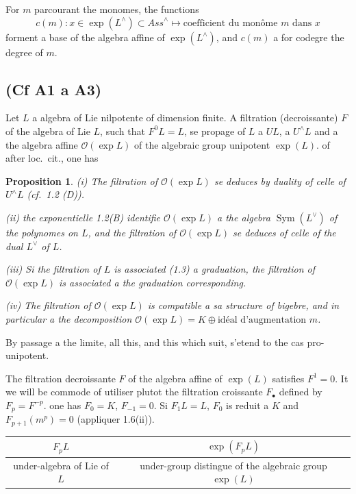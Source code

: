\documentclass[11pt,a4paper]{article}
\theoremstyle{plain}
\newtheorem{proposition}[theorem]{Proposition}
\theoremstyle{definition}
\DeclareMathOperator{\Sym}{Sym}
\newcommand{\Ass}{\textit{Ass}}
\begin{document}
For $m$ parcourant the monomes, the functions
\begin{equation}
\label{eq:1.4.2}
c(m): x \in \exp(L^{\wedge}) \subset \Ass^{\wedge} \mapsto \text{coefficient du mon\^ome $m$ dans $x$}
\end{equation}
forment a base of the algebra affine of $\exp(L^{\wedge})$, and $c(m)$ a for codegre the degree of $m$.

\subsection{(Cf \cite{1} A1 a A3)}
Let $L$ a algebra of Lie nilpotente of dimension finite. A filtration (decroissante) $F$ of the algebra of Lie $L$, such that $F^0L = L$, se propage of $L$ a $UL$, a $U^{\wedge}L$ and a the algebra affine $\mathcal{O}(\exp L)$ of the algebraic group unipotent $\exp(L)$. of after loc.~cit., one has

\begin{proposition}
\label{prop:1.6}
\emph{(i)} The filtration of $\mathcal{O}(\exp L)$ se deduces by duality of celle of $U^{\wedge}L$ (cf.~1.2 (D)).

\emph{(ii)} the exponentielle 1.2(B) identifie $\mathcal{O}(\exp L)$ a the algebra $\Sym(L^{\vee})$ of the polynomes on $L$, and the filtration of $\mathcal{O}(\exp L)$ se deduces of celle of the dual $L^{\vee}$ of $L$.

\emph{(iii)} Si the filtration of $L$ is associated (1.3) a graduation, the filtration of $\mathcal{O}(\exp L)$ is associated a the graduation corresponding.

\emph{(iv)} The filtration of $\mathcal{O}(\exp L)$ is compatible a sa structure of bigebre, and in particular a the decomposition $\mathcal{O}(\exp L) = K \oplus \text{id\'eal d'augmentation } m$.
\end{proposition}

By passage a the limite, all this, and this which suit, s'etend to the cas pro-unipotent.

The filtration decroissante $F$ of the algebra affine of $\exp(L)$ satisfies $F^1 = 0$. It we will be commode of utiliser plutot the filtration croissante $F_{\bullet}$ defined by $F_p = F^{-p}$. one has $F_0 = K$, $F_{-1} = 0$. Si $F_1L = L$, $F_0$ is reduit a $K$ and $F_{p+1}(m^p) = 0$ (appliquer 1.6(ii)).

\begin{center}
\begin{tabular}{c|c}
$F_pL$ & $\exp(F_pL)$ \\ \hline
under-algebra of Lie of $L$ & under-group distingue of the algebraic group $\exp(L)$
\end{tabular}
\end{center}
\end{document}
